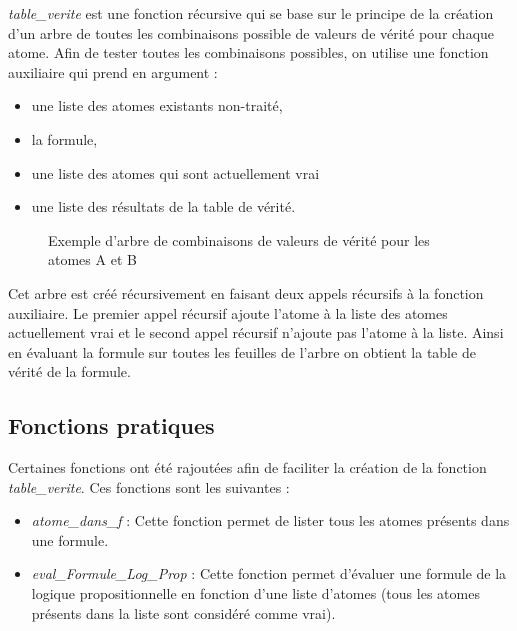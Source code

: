 \documentclass[12pt, letterpaper, french]{article}
\begin{document}
\emph{table\_verite} est une fonction récursive qui se base sur le principe de 
la création d'un arbre de toutes les combinaisons possible de valeurs de vérité
pour chaque atome. Afin de tester toutes les combinaisons possibles, on utilise
une fonction auxiliaire qui prend en argument : 
\begin{itemize}
    \item une liste des atomes existants non-traité, 
    \item la formule,
    \item une liste des atomes qui sont actuellement vrai 
    \item une liste des résultats de la table de vérité.
\end{itemize}
\begin{figure}[h]
    \centering
    \caption{Exemple d'arbre de combinaisons de valeurs de vérité pour les atomes A et B}
\end{figure}

Cet arbre est créé récursivement en faisant deux appels récursifs à la fonction 
auxiliaire. Le premier appel récursif ajoute l'atome à la liste des atomes 
actuellement vrai et le second appel récursif n'ajoute pas l'atome à la liste.
Ainsi en évaluant la formule sur toutes les feuilles de l'arbre on obtient la 
table de vérité de la formule.

\subsection{Fonctions pratiques}

Certaines fonctions ont été rajoutées afin de faciliter la création de la 
fonction \emph{table\_verite}. Ces fonctions sont les suivantes : 

\begin{itemize}
    \item \emph{atome\_dans\_f} : Cette fonction permet de lister tous les atomes présents dans une formule.
    \item \emph{eval\_Formule\_Log\_Prop} : Cette fonction permet d'évaluer une
    formule de la logique propositionnelle en fonction d'une liste d'atomes (tous les atomes présents dans la liste sont considéré comme vrai).
\end{itemize}
\end{document}
